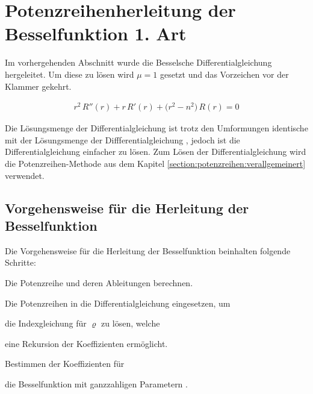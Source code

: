 \section[Potenzreihenherleitung der Besselfunktion]{Potenzreihenherleitung der Besselfunktion 1. Art}
\begin{normalsize}
Im vorhergehenden Abschnitt wurde die Besselsche Differentialgleichung  hergeleitet.
Um diese zu l\"osen wird $\mu = 1$ gesetzt und das Vorzeichen vor der Klammer gekehrt.
\end{normalsize}
\begin{align}
	r^2 \, R'' \left( r \right)
	+
	r \, R' \left( r \right)
	+
	\big( r^2 - n^2 \big) \, R \left( r \right)
	=
	0
	\label{eq:bessel:dgl}
\end{align}
\begin{normalsize}%
Die L\"osungsmenge der Differentialgleichung  ist trotz den Umformungen identische mit der L\"osungsmenge der Diffferentialgleichung , jedoch ist die Differentialgleichung  einfacher zu l\"osen.
Zum L\"osen der Differentialgleichung  wird die Potenzreihen-Methode aus dem Kapitel \ref{section:potenzreihen:verallgemeinert} verwendet.
\end{normalsize}
\subsection{Vorgehensweise f\"ur die Herleitung der Besselfunktion}
\begin{normalsize}%
Die Vorgehensweise f\"ur die Herleitung der Besselfunktion beinhalten folgende Schritte:
\end{normalsize}
\begin{compactenum}
	\item Die Potenzreihe und deren Ableitungen berechnen.
	\item Die Potenzreihen in die Differentialgleichung  eingesetzen, um
	\item die Indexgleichung f\"ur $\varrho$ zu l\"osen, welche
	\item eine Rekursion der Koeffizienten erm\"oglicht.
	\item Bestimmen der Koeffizienten f\"ur
	\item die Besselfunktion mit ganzzahligen Parametern .
\end{compactenum}
\setcounter{stepCounter}{1}
